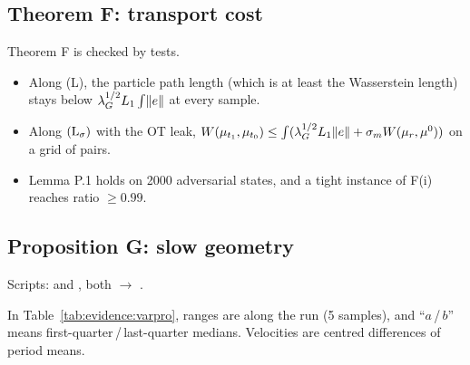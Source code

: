 \subsection{Theorem F: transport cost}

Theorem F is checked by tests.
\begin{itemize}
  \item Along (L), the particle path length (which is at least the Wasserstein length) stays below
    $\lambda_G^{1/2}L_1\int\lVert e\rVert$ at every sample.
  \item Along $(\mathrm{L}_\sigma)$ with the OT leak, $W(\mu_{t_1},\mu_{t_0})\le\int(\lambda_G^{1/2}L_1\lVert e\rVert+\sigma_mW(\mu_r,\mu^0))$
    on a grid of pairs.
  \item Lemma P.1 holds on 2000 adversarial states, and a tight instance of F(i) reaches ratio $\ge0.99$.
\end{itemize}

\subsection{Proposition G: slow geometry}

\begin{sloppypar}\noindent Scripts:  and , both
$\to$ .\end{sloppypar}

In Table~\ref{tab:evidence:varpro}, ranges are along the run (5 samples), and ``$a$\,/\,$b$'' means
first-quarter\,/\,last-quarter medians. Velocities are centred differences of period means.

